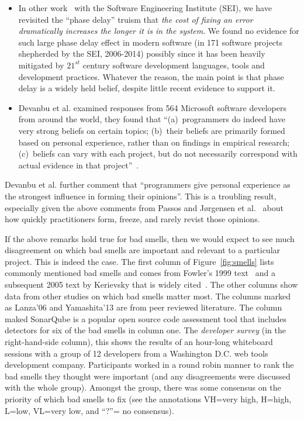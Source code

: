 \documentclass[twocolumn,5p]{elsarticle}
\newcommand{\bi}{\begin{itemize}[leftmargin=0.4cm]}
\newcommand{\ei}{\end{itemize}}
\newcommand{\fig}[1]{Figure~\ref{fig:#1}}
\theoremstyle{break}
\begin{document}
\bi
\item
In other work~\cite{me16phase} with the Software Engineering Institute (SEI), we have revisited
the ``phase delay'' truism that {\em the cost of fixing an error dramatically increases the longer it is in the system}. 
We found no evidence for such large   phase delay effect in modern
software (in 171 software projects shepherded
by the SEI, 2006-2014) possibly since it has been  heavily mitigated by $21^{st}$ century software development languages, tools and development practices. 
Whatever the reason, the main point  is that phase delay is a widely
held belief, despite little recent evidence to support it.
\item
Devanbu et al.  examined responses from 564 Microsoft software developers from around
the world, they found that  ``(a)~programmers do indeed have very
strong beliefs on certain topics; (b)~their beliefs are primarily formed
based on personal experience, rather than on findings in empirical
research; (c)~beliefs can vary with each project, but do not necessarily
correspond with actual evidence in that project''~\cite{prem16}.
\ei
Devanbu et al. further  comment that ``programmers give personal experience
as the strongest influence in forming their opinions''. This is a troubling
result, especially given the above comments from Passos and  J{\o}rgensen et al.~\cite{passos11,jorgensen09} about how quickly practitioners form, freeze, and rarely revist those opinions.





If the above remarks hold true for bad smells, then we would expect
to see much disagreement on which bad smells are important and relevant
to  a particular project. This is indeed the case.
The first column of \fig{smells} 
lists  commonly mentioned bad smells and comes from Fowler's 1999 text~\cite{fowler99} and a subsequent 2005 text by Kerievsky that is widely cited~\cite{Kerievsky2005}.
The other
columns show data from other studies on which bad smells matter most.
The columns marked as Lanza'06 and Yamashita'13 are from peer reviewed literature. The column maked SonarQube is a popular open source
code assessment tool that includes detectors for six of the bad smells
in column one. 
The {\em developer survey}   (in the right-hand-side column),
  this shows the results of an hour-long whiteboard sessions with a group of 12 developers from a Washington
    D.C. web tools development company. Participants
    worked in a round robin manner to rank the bad smells they thought were
    important (and any disagreements were discussed with the whole group).
     Amongst the group, there was  some
    consensus on  the priority of which bad smells to fix
    (see the annotations VH=very high,
    H=high, L=low, VL=very low, and ``?''= no consensus).  
   
\end{document}

